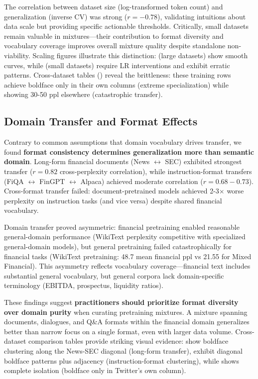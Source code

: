 The correlation between dataset size (log-transformed token count) and generalization (inverse CV) was strong ($r = -0.78$), validating intuitions about data scale but providing specific actionable thresholds. Critically, small datasets remain valuable in mixtures—their contribution to format diversity and vocabulary coverage improves overall mixture quality despite standalone non-viability. Scaling figures illustrate this distinction:  (large datasets) show smooth curves, while  (small datasets) require LR interventions and exhibit erratic patterns. Cross-dataset tables () reveal the brittleness: these training rows achieve boldface only in their own columns (extreme specialization) while showing 30-50 ppl elsewhere (catastrophic transfer).

\subsection{Domain Transfer and Format Effects}

Contrary to common assumptions that domain vocabulary drives transfer, we found \textbf{format consistency determines generalization more than semantic domain}. Long-form financial documents (News $\leftrightarrow$ SEC) exhibited strongest transfer ($r = 0.82$ cross-perplexity correlation), while instruction-format transfers (FiQA $\leftrightarrow$ FinGPT $\leftrightarrow$ Alpaca) achieved moderate correlation ($r = 0.68-0.73$). Cross-format transfer failed: document-pretrained models achieved 2-3$\times$ worse perplexity on instruction tasks (and vice versa) despite shared financial vocabulary.

Domain transfer proved asymmetric: financial pretraining enabled reasonable general-domain performance (WikiText perplexity competitive with specialized general-domain models), but general pretraining failed catastrophically for financial tasks (WikiText pretraining: 48.7 mean financial ppl vs 21.55 for Mixed Financial). This asymmetry reflects vocabulary coverage—financial text includes substantial general vocabulary, but general corpora lack domain-specific terminology (EBITDA, prospectus, liquidity ratios).

These findings suggest \textbf{practitioners should prioritize format diversity over domain purity} when curating pretraining mixtures. A mixture spanning documents, dialogues, and Q\&A formats within the financial domain generalizes better than narrow focus on a single format, even with larger data volume. Cross-dataset comparison tables provide striking visual evidence:  show boldface clustering along the News-SEC diagonal (long-form transfer),  exhibit diagonal boldface patterns plus adjacency (instruction-format clustering), while  shows complete isolation (boldface only in Twitter's own column).

